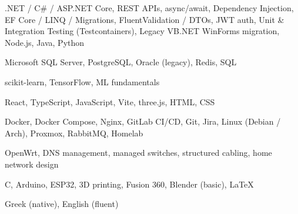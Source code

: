 

\begin{cvskills}

    {.NET / C\# / ASP.NET Core, REST APIs, async/await, Dependency Injection, EF Core / LINQ / Migrations, FluentValidation / DTOs, JWT auth, Unit \& Integration Testing (Testcontainers), Legacy VB.NET WinForms migration, Node.js, Java, Python} %

    {Microsoft SQL Server, PostgreSQL, Oracle (legacy), Redis, SQL} %

    {scikit-learn, TensorFlow, ML fundamentals} %

    {React, TypeScript, JavaScript, Vite, three.js, HTML, CSS} %

    {Docker, Docker Compose, Nginx, GitLab CI/CD, Git, Jira, Linux (Debian / Arch), Proxmox, RabbitMQ, Homelab} %

    {OpenWrt, DNS management, managed switches, structured cabling, home network design} %

    {C, Arduino, ESP32, 3D printing, Fusion 360, Blender (basic), LaTeX} %

    {Greek (native), English (fluent)} %

\end{cvskills}
